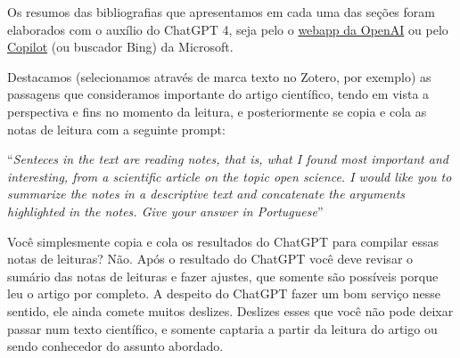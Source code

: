 \documentclass[
  a4paper,
]{book}
\newcounter{quartocallouttipno}
\newcommand{\quartocallouttip}[1]{\refstepcounter{quartocallouttipno}\label{#1}}
\begin{document}
\begin{tcolorbox}[enhanced jigsaw, leftrule=.75mm, opacityback=0, arc=.35mm, colbacktitle=quarto-callout-important-color!10!white, breakable, title=\textcolor{quarto-callout-important-color}{\faExclamation}\hspace{0.5em}{Tip \ref*{tip-prompt}: ChatGPT para suas notas de leituras}, left=2mm, toprule=.15mm, colback=white, titlerule=0mm, colframe=quarto-callout-important-color-frame, bottomtitle=1mm, bottomrule=.15mm, toptitle=1mm, opacitybacktitle=0.6, coltitle=black, rightrule=.15mm]

\quartocallouttip{tip-prompt} 

Os resumos das bibliografias que apresentamos em cada uma das seções
foram elaborados com o auxílio do ChatGPT 4, seja pelo o
\href{https://chat.openai.com/}{webapp da OpenAI} ou pelo
\href{https://copilot.microsoft.com/}{Copilot} (ou buscador Bing) da
Microsoft.\vspace{0.5em}

Destacamos (selecionamos através de marca texto no Zotero, por exemplo)
as passagens que consideramos importante do artigo científico, tendo em
vista a perspectiva e fins no momento da leitura, e posteriormente se
copia e cola as notas de leitura com a seguinte prompt:\vspace{0.5em}

``\emph{Senteces in the text are reading notes, that is, what I found
most important and interesting, from a scientific article on the topic
open science. I would like you to summarize the notes in a descriptive
text and concatenate the arguments highlighted in the notes. Give your
answer in Portuguese}''

\end{tcolorbox}

\begin{tcolorbox}[enhanced jigsaw, leftrule=.75mm, opacityback=0, arc=.35mm, colbacktitle=quarto-callout-caution-color!10!white, breakable, title=\textcolor{quarto-callout-caution-color}{\faFire}\hspace{0.5em}{Não confie cegamente na IA}, left=2mm, toprule=.15mm, colback=white, titlerule=0mm, colframe=quarto-callout-caution-color-frame, bottomtitle=1mm, bottomrule=.15mm, toptitle=1mm, opacitybacktitle=0.6, coltitle=black, rightrule=.15mm]

Você simplesmente copia e cola os resultados do ChatGPT para compilar
essas notas de leituras? Não. Após o resultado do ChatGPT você deve
revisar o sumário das notas de leituras e fazer ajustes, que somente são
possíveis porque leu o artigo por completo. A despeito do ChatGPT fazer
um bom serviço nesse sentido, ele ainda comete muitos deslizes. Deslizes
esses que você não pode deixar passar num texto científico, e somente
captaria a partir da leitura do artigo ou sendo conhecedor do assunto
abordado.

\end{tcolorbox}
\end{document}
